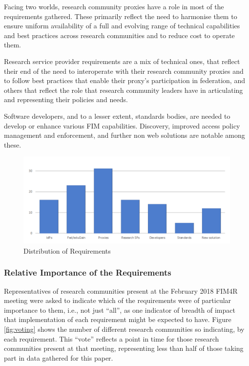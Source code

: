 \documentclass[fleqn,10pt]{wlscirep}
\begin{document}
{Facing two worlds, research community proxies have a role in most of the requirements gathered. These primarily reflect the need to harmonise them to ensure uniform availability of a full and evolving range of technical capabilities and best practices across research communities and to reduce cost to operate them.

Research service provider requirements are a mix of technical ones, that reflect their end of the need to interoperate with their research community proxies and to follow best practices that enable their proxy’s participation in federation, and others that reflect the role that research community leaders have in articulating and representing their policies and needs.

Software developers, and to a lesser extent, standards bodies, are needed to develop or enhance various FIM capabilities. Discovery, improved access policy management and enforcement, and further non web solutions are notable among these.

\begin{figure}[ht!]
  \centering
  \includegraphics[width=0.7\columnwidth]{RequirementsBreakdown.png}
  \caption{Distribution of Requirements}
  \label{fig:breakdown}
\end{figure}

\subsubsection{Relative Importance of the Requirements}

Representatives of research communities present at the February 2018 FIM4R meeting were asked to indicate which of the requirements were of particular importance to them, i.e., not just “all”, as one indicator of breadth of impact that implementation of each requirement might be expected to have. Figure \ref{fig:voting} shows the number of different research communities so indicating, by each requirement. This “vote” reflects a point in time for those research communities present at that meeting, representing less than half of those taking part in data gathered for this paper.

}
\end{document}
